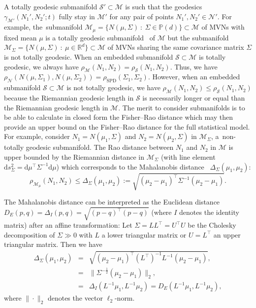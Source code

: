 \documentclass[entropy,article,accept,oneauthor,pdftex,entropy]{Definitions/mdpi}
\def\bbP{\mathbb{P}}
\def\calS{\mathcal{S}}
\def\calM{\mathcal{M}}
\def\SPD{\mathrm{SPD}}
\def\bbR{\mathbb{R}}
\def\calN{\mathcal{N}}
\def\SPD{\mathrm{SPD}}
\def\dmu{\mathrm{d}\mu}
\def\ds{\mathrm{d}s}
\def\st{\ :\ }
\def\bbR{\mathbb{R}}
\begin{document}
A totally geodesic submanifold $\calS'\subset\calM$ is such that the geodesics $\gamma_{\calM'}(N_1',N_2';t)$ fully stay in $\calM'$ for any pair of points $N_1',N_2'\in\calN'$.
For example, the~submanifold $\calM_\mu=\{N(\mu,\Sigma)\st \Sigma\in\bbP(d)\}\subset\calM$ of MVNs with fixed mean $\mu$ is a totally geodesic submanifold~\cite{godinho2012introduction} of $\calM$ but the submanifold $\calM_\Sigma=\{N(\mu,\Sigma)\st \mu\in\bbR^d\}\subset\calM$ of MVNs sharing the same  
covariance matrix $\Sigma$ is not totally geodesic. 
When an embedded submanifold $\calS\subset\calM$ is totally geodesic, we always 
have $\rho_{\calM}(N_1,N_2)=\rho_{\calS}(N_1,N_2)$.
Thus, we have $\rho_\calN(N(\mu,\Sigma_1),N(\mu,\Sigma_2))=\rho_\SPD(\Sigma_1,\Sigma_2)$.
However, when an embedded submanifold $\calS\subset\calM$ is not totally geodesic, we have $\rho_{\calM}(N_1,N_2)\leq \rho_{\calS}(N_1,N_2)$ because the Riemannian geodesic length in $\calS$ is necessarily longer or equal than the Riemannian geodesic length in $\calM$.
The merit to consider submanifolds is to be able to calculate in closed form the Fisher–Rao distance which may then provide an upper bound on the Fisher–Rao distance for the full statistical model.
For example, consider $N_1=N(\mu_1,\Sigma)$ and $N_2=N(\mu_2,\Sigma)$ in $\calM_\Sigma$, a~non-totally geodesic submanifold.
The Rao distance between $N_1$ and $N_2$ in $\calM$ is upper bounded by the Riemannian distance in $\calM_\Sigma$ 
(with line element $\ds_\Sigma^2=\dmu^\top\Sigma^{-1}\dmu$) which corresponds to the Mahalanobis distance~\cite{mahalanobis1936generalised,AtkinsonRao-1981} $\Delta_\Sigma(\mu_1,\mu_2)$:
\begin{equation}
\rho_{\calM_\mu}(N_1,N_2)\leq  \Delta_\Sigma(\mu_1,\mu_2):=\sqrt{(\mu_2-\mu_1)^\top \Sigma^{-1} (\mu_2-\mu_1)}.
\end{equation}
 
The Mahalanobis distance can be interpreted as the Euclidean distance $D_E(p,q)=\Delta_I(p,q)=\sqrt{(p-q)^\top (p-q)}$ (where $I$ denotes the identity matrix) after an affine transformation: Let $\Sigma=LL^\top=U^\top U$ be the Cholesky decomposition of $\Sigma\gg 0$ with $L$ a lower triangular matrix or $U=L^\top$ an upper triangular matrix. Then we have 
\begin{eqnarray*}
\Delta_\Sigma(\mu_1,\mu_2)&=&\sqrt{(\mu_2-\mu_1)^\top (L^\top)^{-1} L^{-1} (\mu_2-\mu_1)},\\
&=&\|\Sigma^{-\frac{1}{2}}(\mu_2-\mu_1)\|_2,\\
&=&\Delta_I(L^{-1}\mu_1,L^{-1}\mu_2)=D_E(L^{-1}\mu_1,L^{-1}\mu_2),
\end{eqnarray*}
where $\|\cdot\|_2$ denotes the vector $\ell_2$-norm.
\end{document}
